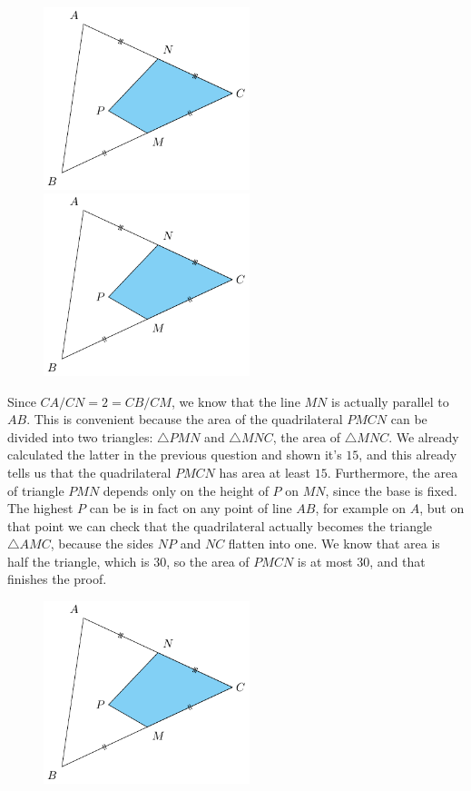 \documentclass[11pt]{scrartcl}
\begin{document}
\begin{enumerate}[label=\textbf{G\arabic*}.]
    \begin{figure}[h]
        \centering
        \includegraphics[width=6cm, page=1]{Diagrams/G2sol.pdf}
        \includegraphics[width=6cm, page=4]{Diagrams/G2sol.pdf}
    \end{figure}
    
    Since $CA/CN = 2 = CB/CM$, we know that the line $MN$ is actually parallel to $AB$. This is convenient because the area of the quadrilateral $PMCN$ can be divided into two triangles: $\triangle PMN$ and $\triangle MNC$, the area of $\triangle MNC$. We already calculated the latter in the previous question and shown it's $15$, and this already tells us that the quadrilateral $PMCN$ has area at least $15$. Furthermore, the area of triangle $PMN$ depends only on the height of $P$ on $MN$, since the base is fixed. The highest $P$ can be is in fact on any point of line $AB$, for example on $A$, but on that point we can check that the quadrilateral actually becomes the triangle $\triangle AMC$, because the sides $NP$ and $NC$ flatten into one. We know that area is half the triangle, which is $30$, so the area of $PMCN$ is at most $30$, and that finishes the proof.

    \begin{figure}[h]
        \centering
        \includegraphics[width=6cm, page=3]{Diagrams/G2sol.pdf}
    \end{figure}


\end{enumerate}
\end{document}
